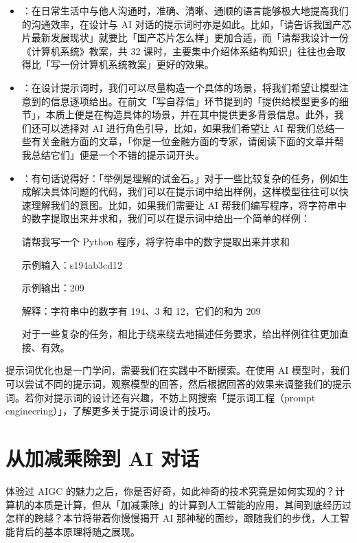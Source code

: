 \begin{itemize}
  \item {}：在日常生活中与他人沟通时，准确、清晰、通顺的语言能够极大地提高我们的沟通效率，在设计与 AI 对话的提示词时亦是如此。比如，「请告诉我国产芯片最新发展现状」就要比「国产芯片怎么样」更加合适，而「请帮我设计一份《计算机系统》教案，共 32 课时，主要集中介绍体系结构知识」往往也会取得比「写一份计算机系统教案」更好的效果。
  \item {}：在设计提示词时，我们可以尽量构造一个具体的场景，将我们希望让模型注意到的信息逐项给出。在前文「写自荐信」环节提到的「提供给模型更多的细节」，本质上便是在构造具体的场景，并在其中提供更多背景信息。此外，我们还可以选择对 AI 进行角色引导，比如，如果我们希望让 AI 帮我们总结一些有关金融方面的文章，「你是一位金融方面的专家，请阅读下面的文章并帮我总结它们」便是一个不错的提示词开头。
  \item {}：有句话说得好：「举例是理解的试金石。」对于一些比较复杂的任务，例如生成解决具体问题的代码，我们可以在提示词中给出样例，这样模型往往可以快速理解我们的意图。比如，如果我们需要让 AI 帮我们编写程序，将字符串中的数字提取出来并求和，我们可以在提示词中给出一个简单的样例：
    \begin{quoting}
      请帮我写一个 Python 程序，将字符串中的数字提取出来并求和\par
      \phantom{text}\par
      示例输入：s194ab3cd12\par
      示例输出：209\par
      解释：字符串中的数字有 194、3 和 12，它们的和为 209\par
    \end{quoting}
    对于一些复杂的任务，相比于绕来绕去地描述任务要求，给出样例往往更加直接、有效。
\end{itemize}

提示词优化也是一门学问，需要我们在实践中不断摸索。在使用 AI 模型时，我们可以尝试不同的提示词，观察模型的回答，然后根据回答的效果来调整我们的提示词。若你对提示词的设计还有兴趣，不妨上网搜索「提示词工程（prompt engineering）」，了解更多关于提示词设计的技巧。

\section{从加减乘除到 AI 对话}

体验过 AIGC 的魅力之后，你是否好奇，如此神奇的技术究竟是如何实现的？计算机的本质是计算，但从「加减乘除」的计算到人工智能的应用，其间到底经历过怎样的跨越？本节将带着你慢慢揭开 AI 那神秘的面纱，跟随我们的步伐，人工智能背后的基本原理将随之展现。

